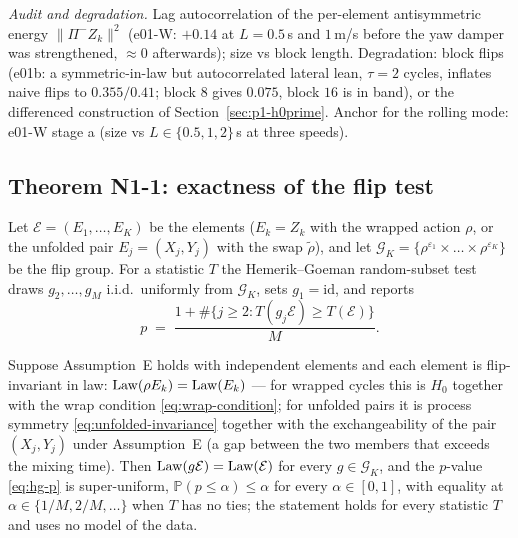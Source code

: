 \emph{Audit and degradation.} Lag autocorrelation of the per-element
antisymmetric energy $\|\Pi^-Z_k\|^2$ (e01-W: $+0.14$ at $L = 0.5$\,s and
$1$\,m/s before the yaw damper was strengthened, $\approx 0$ afterwards);
size vs block length. Degradation: block flips (e01b: a symmetric-in-law but
autocorrelated lateral lean, $\tau = 2$ cycles, inflates naive flips to
$0.355/0.41$; block $8$ gives $0.075$, block $16$ is in band), or the differenced
construction of Section~\ref{sec:p1-h0prime}. Anchor for the rolling mode:
e01-W stage a (size vs $L \in \{0.5, 1, 2\}$\,s at three speeds).

\subsection{Theorem N1-1: exactness of the flip test}
\label{sec:n1-1}

Let $\mathcal{E} = (E_1,\dots,E_K)$ be the elements ($E_k = Z_k$ with the
wrapped action $\rho$, or the unfolded pair $E_j = (X_j, Y_j)$ with the swap
$\tilde\rho$), and let $\mathcal{G}_K = \{\rho^{\varepsilon_1} \times \dots
\times \rho^{\varepsilon_K}\}$ be the flip group. For a statistic $T$ the
Hemerik--Goeman random-subset test draws $g_2,\dots,g_M$ i.i.d.\ uniformly
from $\mathcal{G}_K$, sets $g_1 = \mathrm{id}$, and reports
\begin{equation}
  \label{eq:hg-p}
  p \;=\; \frac{1 + \#\{ j \ge 2 : T(g_j \mathcal{E}) \ge T(\mathcal{E}) \}}{M}.
\end{equation}

\begin{theorem}[N1-1, exactness]
\label{thm:n1-1}
Suppose Assumption~E holds with independent elements and each element is
flip-invariant in law: $\operatorname{Law}(\rho E_k) = \operatorname{Law}(E_k)$ --- for wrapped cycles
this is $H_0$ together with the wrap condition \eqref{eq:wrap-condition};
for unfolded pairs it is process symmetry \eqref{eq:unfolded-invariance}
together with the exchangeability of the pair $(X_j, Y_j)$ under Assumption~E
(a gap between the two members that exceeds the mixing time). Then
$\operatorname{Law}(g\mathcal{E}) = \operatorname{Law}(\mathcal{E})$ for every $g \in \mathcal{G}_K$, and
the $p$-value \eqref{eq:hg-p} is super-uniform, $\mathbb{P}(p \le \alpha)
\le \alpha$ for every $\alpha \in [0,1]$, with equality at $\alpha \in
\{1/M, 2/M, \dots\}$ when $T$ has no ties; the statement holds for every
statistic $T$ and uses no model of the data.
\end{theorem}

